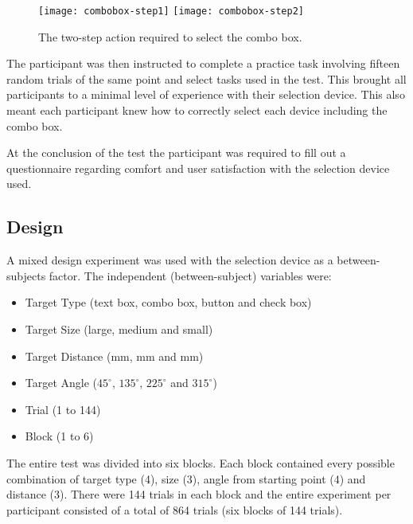 \documentclass{elsart}
\begin{document}
\begin{figure}
	\centering
	\texttt{[image: combobox-step1]}\quad
	\texttt{[image: combobox-step2]}
	\caption{The two-step action required to select the combo box.}
	\label{fig-combo-box}
\end{figure}

The participant was then instructed to complete a practice task
involving fifteen random trials of the same point and select tasks used
in the test. This brought all participants to a minimal level of
experience with their selection device. This also meant each participant
knew how to correctly select each device including the combo box.

At the conclusion of the test the participant was required to fill out a
questionnaire regarding comfort and user satisfaction with the selection
device used.

\subsection{Design}
\label{sec-method-design}

A mixed design experiment was used with the selection device as a
between-subjects factor. The independent (between-subject) variables
were:

\begin{itemize}

	\item Target Type (text box, combo box, button and check box)

	\item Target Size (large, medium and small)

	\item Target Distance (\unit[40]{mm}, \unit[80]{mm} and
	\unit[160]{mm})

	\item Target Angle (\(45^{\circ}\), \(135^{\circ}\), \(225^{\circ}\)
	and \(315^{\circ}\))

	\item Trial (1 to 144)

	\item Block (1 to 6)

\end{itemize}

The entire test was divided into six blocks. Each block contained every
possible combination of target type (4), size (3), angle from starting
point (4) and distance (3). There were 144 trials in each block and the
entire experiment per participant consisted of a total of 864 trials
(six blocks of 144 trials).
\end{document}
